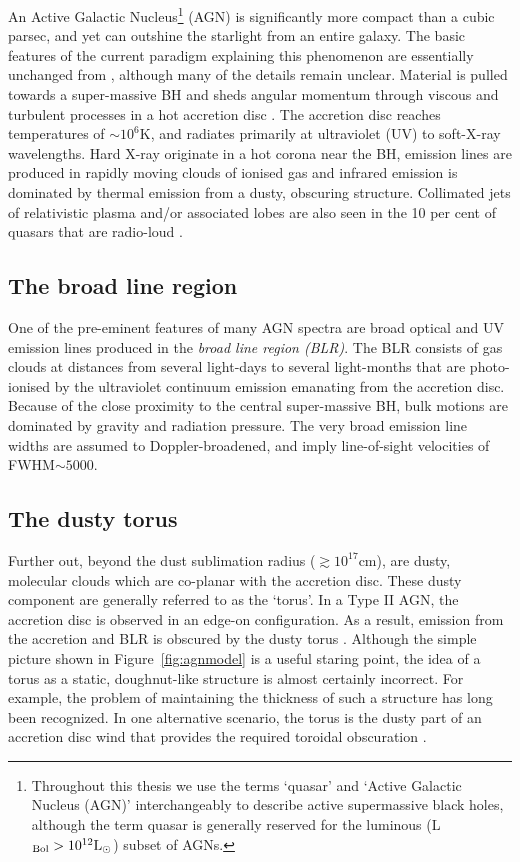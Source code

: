 An Active Galactic Nucleus\footnote{Throughout this thesis we use the terms `quasar' and `Active Galactic Nucleus (AGN)' interchangeably to describe active supermassive black holes, although the term quasar is generally reserved for the luminous (L$_{\rm Bol} > 10^{12}{\rm L}_{\odot}$) subset of AGNs.} (AGN) is significantly more compact than a cubic parsec, and yet can outshine the starlight from an entire galaxy. 
The basic features of the current paradigm explaining this phenomenon are essentially unchanged from \citet{salpeter64}, although many of the details remain unclear.
Material is pulled towards a super-massive BH and sheds angular momentum through viscous and turbulent processes in a hot accretion disc \citep[e.g.][]{begelman85}. 
The accretion disc reaches temperatures of $\sim$$10^6$K, and radiates primarily at ultraviolet (UV) to soft-X-ray wavelengths. 
Hard X-ray originate in a hot corona near the BH, emission lines are produced in rapidly moving clouds of ionised gas and infrared emission is dominated by thermal emission from a dusty, obscuring structure. 
Collimated jets of relativistic plasma and/or associated lobes are also seen in the 10 per cent of quasars that are radio-loud \citep[e.g.][]{peterson97}. 

\subsection{The broad line region}

One of the pre-eminent features of many AGN spectra are broad optical and UV emission lines produced in the {\em broad line region (BLR)}. 
The BLR consists of gas clouds at distances from several light-days to several light-months that are photo-ionised by the ultraviolet continuum emission emanating from the accretion disc.  
Because of the close proximity to the central super-massive BH, bulk motions are dominated by gravity and radiation pressure.
The very broad emission line widths are assumed to Doppler-broadened, and imply line-of-sight velocities of FWHM$\sim$$5000$\kms. 

\subsection{The dusty torus}

Further out, beyond the dust sublimation radius ($\gtrsim10^{17}$cm), are dusty, molecular clouds which are co-planar with the accretion disc. 
These dusty component are generally referred to as the `torus'. 
In a Type II AGN, the accretion disc is observed in an edge-on configuration. 
As a result, emission from the accretion and BLR is obscured by the dusty torus \citep[e.g.][]{antonucci93}.
Although the simple picture shown in Figure~\ref{fig:agnmodel} is a useful staring point, the idea of a torus as a static, doughnut-like structure is almost certainly incorrect. 
For example, the problem of maintaining the thickness of such a structure has long been recognized. 
In one alternative scenario, the torus is the dusty part of an accretion disc wind that provides the required toroidal obscuration \citep[e.g.][]{konigl94,everett09,gallagher12,everett05,keating12,elitzur06}. 

